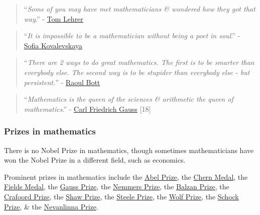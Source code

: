 \documentclass{article}
\begin{document}
\begin{quotation}
	``\textit{Some of you may have met mathematicians \& wondered how they got that way}.'' - \href{https://en.wikipedia.org/wiki/Tom_Lehrer}{Tom Lehrer}
\end{quotation}

\begin{quotation}
	``\textit{It is impossible to be a mathematician without being a poet in soul}.'' - \href{https://en.wikipedia.org/wiki/Sofia_Kovalevskaya}{Sofia Kovalevskaya}
\end{quotation}

\begin{quotation}
	``\textit{There are 2 ways to do great mathematics. The first is to be smarter than everybody else. The second way is to be stupider than everybody else - but persistent.}'' - \href{https://en.wikipedia.org/wiki/Raoul_Bott}{Raoul Bott}
\end{quotation}

\begin{quotation}
	``\textit{Mathematics is the queen of the sciences \& arithmetic the queen of mathematics}.'' - \href{https://en.wikipedia.org/wiki/Carl_Friedrich_Gauss}{Carl Friedrich Gauss} [18]
\end{quotation}

\subsubsection{Prizes in mathematics}
There is no Nobel Prize in mathematics, though sometimes mathematicians have won the Nobel Prize in a different field, such as economics.

Prominent prizes in mathematics include the \href{https://en.wikipedia.org/wiki/Abel_Prize}{Abel Prize}, the \href{https://en.wikipedia.org/wiki/Chern_Medal}{Chern Medal}, the \href{https://en.wikipedia.org/wiki/Fields_Medal}{Fields Medal}, the \href{https://en.wikipedia.org/wiki/Gauss_Prize}{Gauss Prize}, the \href{https://en.wikipedia.org/wiki/Frederic_Esser_Nemmers_Prize}{Nemmers Prize}, the \href{https://en.wikipedia.org/wiki/Balzan_Prize}{Balzan Prize}, the \href{https://en.wikipedia.org/wiki/Crafoord_Prize}{Crafoord Prize}, the \href{https://en.wikipedia.org/wiki/Shaw_Prize}{Shaw Prize}, the \href{https://en.wikipedia.org/wiki/Steele_Prize}{Steele Prize}, the \href{https://en.wikipedia.org/wiki/Wolf_Prize}{Wolf Prize}, the \href{https://en.wikipedia.org/wiki/Schock_Prize}{Schock Prize}, \& the \href{https://en.wikipedia.org/wiki/Nevanlinna_Prize}{Nevanlinna Prize}.
\end{document}
